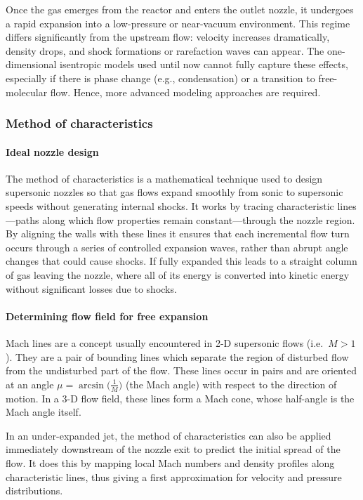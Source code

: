 Once the gas emerges from the reactor and enters the outlet nozzle, it undergoes a rapid expansion into a low-pressure or near-vacuum environment.
This regime differs significantly from the upstream flow: velocity increases dramatically, density drops, and shock formations or rarefaction waves can appear.
The one-dimensional isentropic models used until now cannot fully capture these effects, especially if there is phase change (e.g., condensation) or a transition to free-molecular flow.
Hence, more advanced modeling approaches are required.
\cite{jousten_handbook_2016, anderson2021modern}

\subsubsection*{Method of characteristics}

	\paragraph*{Ideal nozzle design}
		The method of characteristics is a mathematical technique used to design supersonic nozzles so that gas flows expand smoothly from sonic to supersonic speeds without generating internal shocks.
		It works by tracing characteristic lines—paths along which flow properties remain constant—through the nozzle region.
		By aligning the walls with these lines it ensures that each incremental flow turn occurs through a series of controlled expansion waves, rather than abrupt angle changes that could cause shocks.
		If fully expanded this leads to a straight column of gas leaving the nozzle, where all of its energy is converted into kinetic energy without significant losses due to shocks.
		\cite{khare_rocket_2021, fernandes_shape_2023}

	\paragraph*{Determining flow field for free expansion}
		Mach lines are a concept usually encountered in 2-D supersonic flows (i.e.\ $M > 1$). 
		They are a pair of bounding lines which separate the region of disturbed flow from the 
		undisturbed part of the flow. These lines occur in pairs and are oriented at an angle
		$\mu = \arcsin\!\bigl(\frac{1}{M}\bigr)$ (the Mach angle) with respect to the direction 
		of motion. In a 3-D flow field, these lines form a Mach cone, whose half-angle is the 
		Mach angle itself.

		In an under-expanded jet, the method of characteristics can also be applied immediately 
		downstream of the nozzle exit to predict the initial spread of the flow. It does this by 
		mapping local Mach numbers and density profiles along characteristic lines, thus giving 
		a first approximation for velocity and pressure distributions.

